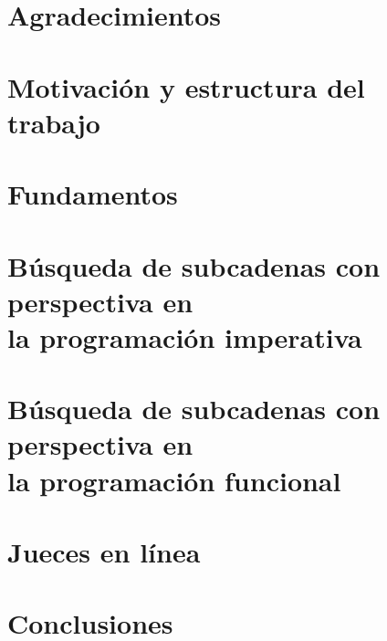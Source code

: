 \documentclass{book}
\begin{document}
\thispagestyle{empty}
\frontmatter
    
    \clearpage
    \mbox{}
    \clearpage
    \thispagestyle{empty}
    
    
    
    \chapter*{Agradecimientos}
    
    \clearpage
    
    \tableofcontents

\mainmatter
    \chapter*{Motivación y estructura del trabajo}
        
    
    \chapter{Fundamentos}
        
    
    \chapter{Búsqueda de subcadenas con perspectiva en \\la programación imperativa}
    \chaptermark{} %
        
    
    \chapter{Búsqueda de subcadenas con perspectiva en \\la programación funcional}
    \chaptermark{} %
        

    \chapter{\QuickCheck}
        

    \chapter{Jueces en línea}
        
    
    \chapter{Conclusiones}
        
    
    \begin{appendices}
        
        
                    
    \end{appendices}

\backmatter
    \nocite{*}
    \printbibliography
\end{document}
